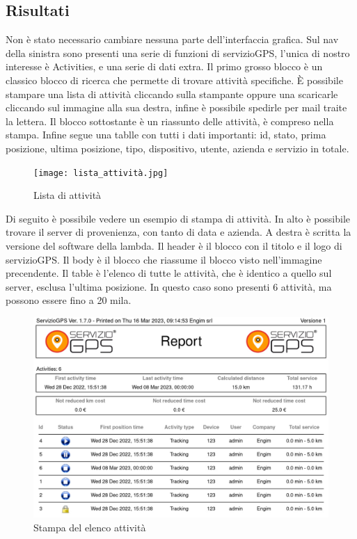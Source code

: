 \documentclass[12pt]{article}
\begin{document}
\subsection{Risultati}
Non è stato necessario cambiare nessuna parte dell'interfaccia grafica.
Sul nav della sinistra sono presenti una serie di funzioni di servizioGPS, 
l'unica di nostro interesse è Activities, e una serie di dati extra. 
Il primo grosso blocco è un classico blocco di ricerca che permette 
di trovare attività specifiche.
È possibile stampare una lista di attività cliccando sulla stampante oppure una 
scaricarle cliccando sul immagine alla sua destra, infine è possibile spedirle 
per mail traite la lettera. 
Il blocco sottostante è un riassunto delle attività, è compreso nella stampa. 
Infine segue una tablle con tutti i dati importanti: id, stato, 
prima posizione, ultima posizione, tipo, dispositivo, utente, 
azienda e servizio in totale. 
\begin{figure}[H]
\texttt{[image: lista\_attività.jpg]}
\caption{Lista di attività}
\end{figure}
Di seguito è possibile vedere un esempio di stampa di attività. 
In alto è possibile trovare il server di provenienza, con tanto di data e 
azienda.
A destra è scritta la versione del software della lambda. 
Il header è il blocco con il titolo e il logo di servizioGPS.
Il body è il blocco che riassume il blocco visto nell'immagine precendente. 
Il table è l'elenco di tutte le attività, che è identico a quello sul server, 
esclusa l'ultima posizione.
In questo caso sono presenti 6 attività, ma possono essere fino a 20 mila. 
\begin{figure}[H]
\includegraphics[width =\textwidth]{report.png}
\caption{Stampa del elenco attività}
\end{figure}
\end{document}
